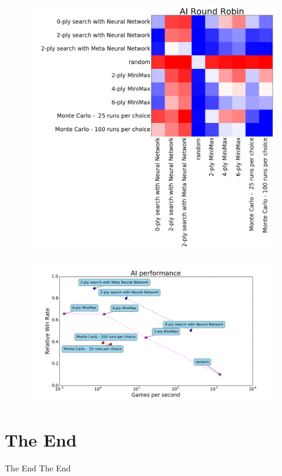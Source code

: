 \begin{frame}
\begin{figure}
\includegraphics[width=0.70 \textwidth]{round_robin}
\end{figure}
\end{frame}

\begin{frame}
\begin{figure}
\includegraphics[width=1.0 \textwidth]{performance}
\end{figure}
\end{frame}

\section{The End}
\begin{frame}[c]{The End}\centering
\huge The End
\end{frame}

